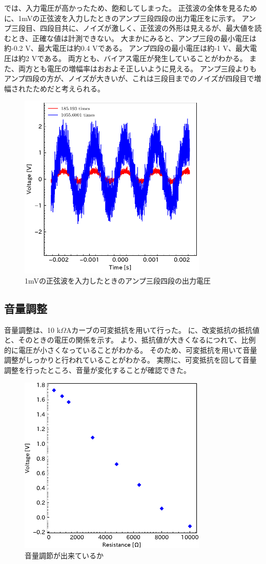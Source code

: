 \documentclass[report.tex]{subfiles}
\begin{document}
では、入力電圧が高かったため、飽和してしまった。
正弦波の全体を見るために、1mVの正弦波を入力したときのアンプ三段四段の出力電圧をに示す。
アンプ三段目、四段目共に、ノイズが激しく、正弦波の外形は見えるが、最大値を読むとき、正確な値は計測できない。
大まかにみると、アンプ三段の最小電圧は約-0.2 V、最大電圧は約0.4 Vである。
アンプ四段の最小電圧は約-1 V、最大電圧は約2 Vである。
両方とも、バイアス電圧が発生していることがわかる。
また、両方とも電圧の増幅率はおおよそ正しいように見える。
アンプ三段よりもアンプ四段の方が、ノイズが大きいが、これは三段目までのノイズが四段目で増幅されたためだと考えられる。

\begin{figure}[H]
	\centering
	\includegraphics[width=9cm]{fig/level34_1m.pdf}
	\caption{1mVの正弦波を入力したときのアンプ三段四段の出力電圧}
	\label{fig:34_1m}
\end{figure}

\subsection{音量調整}

音量調整は、10 k\(\Omega\)Aカーブの可変抵抗を用いて行った。
に、改変抵抗の抵抗値と、そのときの電圧の関係を示す。
より、抵抗値が大きくなるにつれて、比例的に電圧が小さくなっていることがわかる。
そのため、可変抵抗を用いて音量調整がしっかりと行われていることがわかる。
実際に、可変抵抗を回して音量調整を行ったところ、音量が変化することが確認できた。

\begin{figure}[H]
	\centering
	\includegraphics[width=9cm]{fig/resi.pdf}
	\caption{音量調節が出来ているか}
	\label{fig:resi}
\end{figure}
\end{document}
